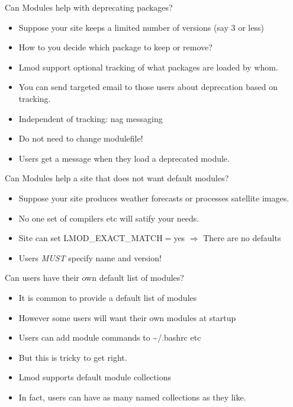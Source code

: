 \documentclass{beamer}
\begin{document}
\begin{frame}{Can Modules help with deprecating packages?}
  \begin{itemize}
    \item Suppose your site keeps a limited number of versions (say 3
      or less)
    \item How to you decide which package to keep or remove?
    \item Lmod support optional tracking of what packages are loaded
      by whom.
    \item You can send targeted email to those users about
      deprecation based on tracking.
    \item Independent of tracking: nag messaging
    \item Do not need to change modulefile!
    \item Users get a message when they load a deprecated module. 
  \end{itemize}
\end{frame}

\begin{frame}{Can Modules help a site that does not want default modules?}
  \begin{itemize}
    \item Suppose your site produces weather forecasts or processes
      satellite images.
    \item No one set of compilers etc will satify your needs.
    \item Site can set LMOD\_EXACT\_MATCH$=$yes $\Rightarrow$ There are no defaults
    \item Users \emph{MUST} specify name and version!
  \end{itemize}
\end{frame}

\begin{frame}{Can users have their own default list of modules?}
  \begin{itemize}
    \item It is common to provide a default list of modules
    \item However some users will want their own modules at startup
    \item Users can add module commands to \textasciitilde/.bashrc etc
    \item But this is tricky to get right.
    \item Lmod supports default module collections
    \item In fact, users can have as many named collections as they like.
  \end{itemize}
\end{frame}
\end{document}
